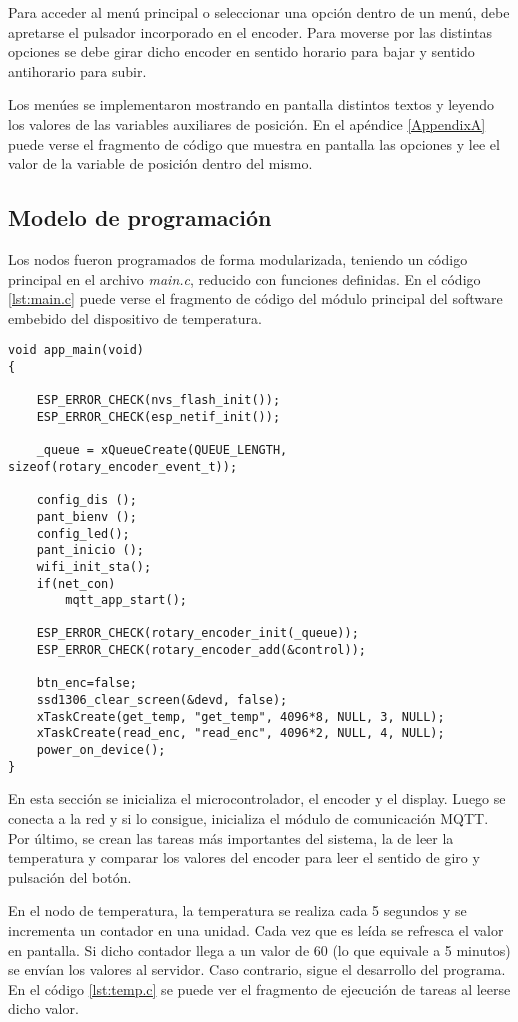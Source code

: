 Para acceder al menú principal o seleccionar una opción dentro de un menú, debe apretarse el pulsador incorporado en el encoder. Para moverse por las distintas opciones se debe girar dicho encoder en sentido horario para bajar y sentido antihorario para subir.

Los menúes se implementaron mostrando en pantalla distintos textos y leyendo los valores de las variables auxiliares de posición. En el apéndice \ref{AppendixA} puede verse el fragmento de código que muestra en pantalla las opciones y lee el valor de la variable de posición dentro del mismo.

\subsection{Modelo de programación}

Los nodos fueron programados de forma modularizada, teniendo un código principal en el archivo \textit{main.c}, reducido con funciones definidas. En el código \ref{lst:main.c} puede verse el fragmento de código del módulo principal del software embebido del dispositivo de temperatura.

\begin{lstlisting}[caption={Código de \textit{main.c}.}, label={lst:main.c}]
void app_main(void)
{
    
	ESP_ERROR_CHECK(nvs_flash_init());
	ESP_ERROR_CHECK(esp_netif_init());

	_queue = xQueueCreate(QUEUE_LENGTH, sizeof(rotary_encoder_event_t));

	config_dis ();
	pant_bienv ();
	config_led();
	pant_inicio ();
	wifi_init_sta();
    if(net_con)
		mqtt_app_start();
	
	ESP_ERROR_CHECK(rotary_encoder_init(_queue));
	ESP_ERROR_CHECK(rotary_encoder_add(&control));
	
	btn_enc=false;
	ssd1306_clear_screen(&devd, false);
	xTaskCreate(get_temp, "get_temp", 4096*8, NULL, 3, NULL);
	xTaskCreate(read_enc, "read_enc", 4096*2, NULL, 4, NULL);
	power_on_device();
}
\end{lstlisting}

En esta sección se inicializa el microcontrolador, el encoder y el display. Luego se conecta a la red y si lo consigue, inicializa el módulo de comunicación MQTT. Por último, se crean las tareas más importantes del sistema, la de leer la temperatura y comparar los valores del encoder para leer el sentido de giro y pulsación del botón.

En el nodo de temperatura, la temperatura se realiza cada 5 segundos y se incrementa un contador en una unidad. Cada vez que es leída se refresca el valor en pantalla. Si dicho contador llega a un valor de 60 (lo que equivale a 5 minutos) se envían los valores al servidor. Caso contrario, sigue el desarrollo del programa. En el código \ref{lst:temp.c} se puede ver el fragmento de ejecución de tareas al leerse dicho valor.

